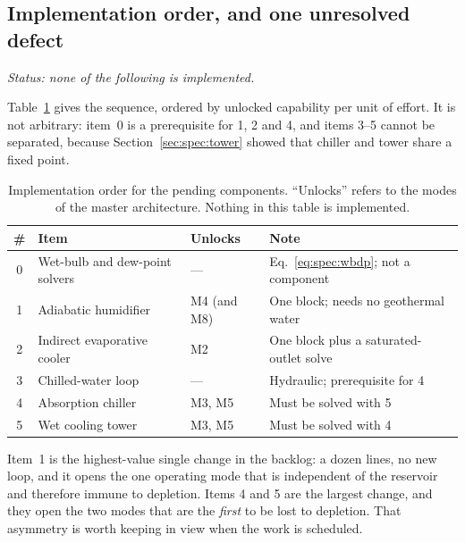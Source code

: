 \subsection{Implementation order, and one unresolved defect}
\label{sec:spec:order}

\emph{Status: none of the following is implemented.}

Table~\ref{tab:spec:order} gives the sequence, ordered by unlocked capability per unit of effort. It
is not arbitrary: item~0 is a prerequisite for 1, 2 and 4, and items 3--5 cannot be separated,
because Section~\ref{sec:spec:tower} showed that chiller and tower share a fixed point.

\begin{table}[htbp]
\centering
\caption{Implementation order for the pending components. ``Unlocks'' refers to the modes of the
master architecture. Nothing in this table is implemented.}
\label{tab:spec:order}
\begin{tabular}{@{}clll@{}}
\toprule
\# & Item & Unlocks & Note \\
\midrule
0 & Wet-bulb and dew-point solvers & --- & Eq.~\eqref{eq:spec:wbdp}; not a component \\
1 & Adiabatic humidifier & M4 (and M8) & One block; needs no geothermal water \\
2 & Indirect evaporative cooler & M2 & One block plus a saturated-outlet solve \\
3 & Chilled-water loop & --- & Hydraulic; prerequisite for 4 \\
4 & Absorption chiller & M3, M5 & Must be solved with 5 \\
5 & Wet cooling tower & M3, M5 & Must be solved with 4 \\
\bottomrule
\end{tabular}
\end{table}

Item~1 is the highest-value single change in the backlog: a dozen lines, no new loop, and it opens
the one operating mode that is independent of the reservoir and therefore immune to depletion. Items
4 and 5 are the largest change, and they open the two modes that are the \emph{first} to be lost to
depletion. That asymmetry is worth keeping in view when the work is scheduled.

